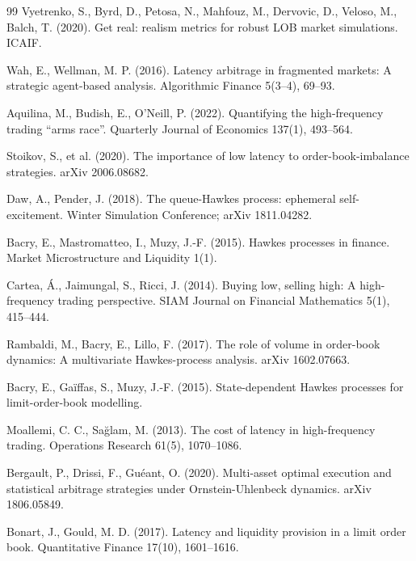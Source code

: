 \documentclass[11pt]{article}
\begin{document}
\begin{thebibliography}{99}
Vyetrenko, S., Byrd, D., Petosa, N., Mahfouz, M., Dervovic, D., Veloso, M., Balch, T. (2020).
Get real: realism metrics for robust LOB market simulations.
ICAIF.

Wah, E., Wellman, M. P. (2016).
Latency arbitrage in fragmented markets: A strategic agent-based analysis.
Algorithmic Finance 5(3--4), 69--93.

Aquilina, M., Budish, E., O'Neill, P. (2022).
Quantifying the high-frequency trading ``arms race''.
Quarterly Journal of Economics 137(1), 493--564.

Stoikov, S., et al. (2020).
The importance of low latency to order-book-imbalance strategies.
arXiv 2006.08682.

Daw, A., Pender, J. (2018).
The queue-Hawkes process: ephemeral self-excitement.
Winter Simulation Conference; arXiv 1811.04282.

Bacry, E., Mastromatteo, I., Muzy, J.-F. (2015).
Hawkes processes in finance.
Market Microstructure and Liquidity 1(1).

Cartea, \'A., Jaimungal, S., Ricci, J. (2014).
Buying low, selling high: A high-frequency trading perspective.
SIAM Journal on Financial Mathematics 5(1), 415--444.

Rambaldi, M., Bacry, E., Lillo, F. (2017).
The role of volume in order-book dynamics: A multivariate Hawkes-process analysis.
arXiv 1602.07663.

Bacry, E., Ga\"iffas, S., Muzy, J.-F. (2015).
State-dependent Hawkes processes for limit-order-book modelling.

Moallemi, C. C., Sa\u{g}lam, M. (2013).
The cost of latency in high-frequency trading.
Operations Research 61(5), 1070--1086.

Bergault, P., Drissi, F., Gu\'eant, O. (2020).
Multi-asset optimal execution and statistical arbitrage strategies under Ornstein-Uhlenbeck dynamics.
arXiv 1806.05849.

Bonart, J., Gould, M. D. (2017).
Latency and liquidity provision in a limit order book.
Quantitative Finance 17(10), 1601--1616.


\end{thebibliography}
\end{document}
